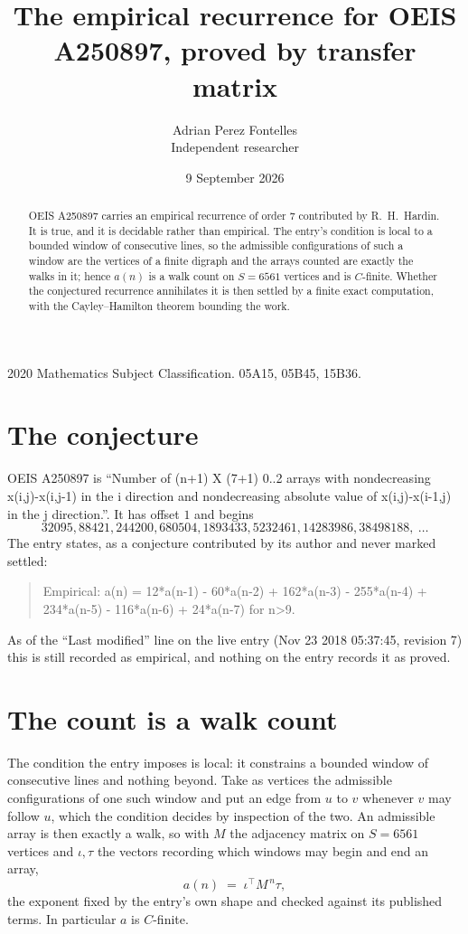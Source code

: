 \documentclass[11pt,a4paper]{article}
\title{The empirical recurrence for OEIS A250897, proved by transfer matrix}
\author{Adrian Perez Fontelles\\ \small Independent researcher}
\date{9 September 2026}
\theoremstyle{plain}
\theoremstyle{definition}
\begin{document}
\maketitle

\begin{abstract}
OEIS A250897 carries an empirical recurrence of order $7$ contributed by R.~H.~Hardin. It is
true, and it is decidable rather than empirical. The entry's condition is local to a bounded window of consecutive lines, so
the admissible configurations of such a window are the vertices of a finite digraph and the
arrays counted are exactly the walks in it; hence $a(n)$ is a walk count on $S=6561$ vertices
and is $C$-finite. Whether the conjectured recurrence annihilates it is then settled by a
finite exact computation, with the Cayley--Hamilton theorem bounding the work.
\end{abstract}

\noindent\small 2020 Mathematics Subject Classification. 05A15, 05B45, 15B36.\normalsize

\section{The conjecture}

OEIS A250897 is ``Number of (n+1) X (7+1) 0..2 arrays with nondecreasing x(i,j)-x(i,j-1) in the i direction and nondecreasing absolute value of x(i,j)-x(i-1,j) in the j direction.''. It has offset $1$ and begins
\[
32095, 88421, 244200, 680504, 1893433, 5232461, 14283986, 38498188,\ \dots
\]
The entry states, as a conjecture contributed by its author and never marked settled:
\begin{quote}
Empirical: a(n) = 12*a(n-1) - 60*a(n-2) + 162*a(n-3) - 255*a(n-4) + 234*a(n-5) - 116*a(n-6) + 24*a(n-7) for n>9.
\end{quote}
As of the ``Last modified'' line on the live entry (Nov 23 2018 05:37:45, revision 7) this is still
recorded as empirical, and nothing on the entry records it as proved.

\section{The count is a walk count}

The condition the entry imposes is local: it constrains a bounded window of consecutive lines and nothing beyond. Take as
vertices the admissible configurations of one such window and put an edge from $u$ to $v$
whenever $v$ may follow $u$, which the condition decides by inspection of the two. An
admissible array is then exactly a walk, so with $M$ the adjacency matrix on $S=6561$ vertices
and $\iota,\tau$ the vectors recording which windows may begin and end an array,
\[
a(n)\;=\;\iota^{\!\top}M^{\,n}\tau ,
\]
the exponent fixed by the entry's own shape and checked against its published terms. In
particular $a$ is $C$-finite.
\end{document}
